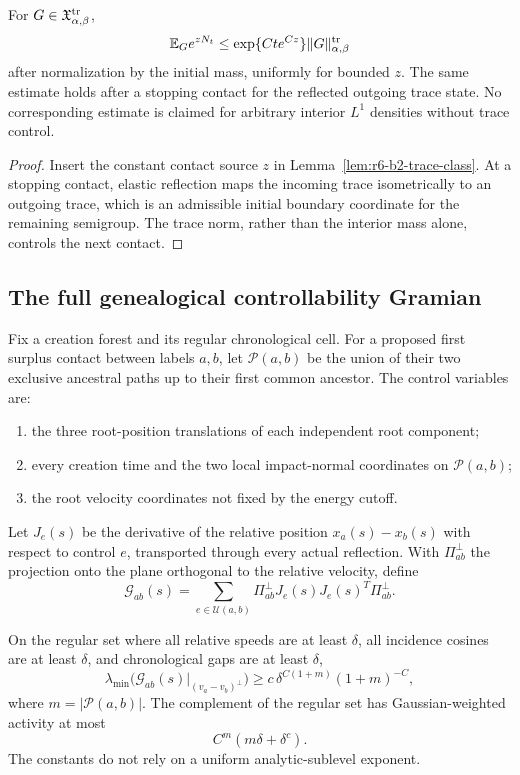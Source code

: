 \begin{corollary}
\label{cor:r6-b2-ledger}
For \(G\in\mathfrak X_{\alpha,\beta}^{\rm tr}\),
\[
\mathbb E_G e^{zN_t}
\le
\exp\{Cte^{Cz}\}
\|G\|_{\alpha,\beta}^{\rm tr}
\]
after normalization by the initial mass, uniformly for bounded \(z\).  The
same estimate holds after a stopping contact for the reflected outgoing trace
state.  No corresponding estimate is claimed for arbitrary interior
\(L^1\) densities without trace control.
\end{corollary}

\begin{proof}
Insert the constant contact source \(z\) in
Lemma~\ref{lem:r6-b2-trace-class}.  At a stopping contact, elastic reflection
maps the incoming trace isometrically to an outgoing trace, which is an
admissible initial boundary coordinate for the remaining semigroup.  The
trace norm, rather than the interior mass alone, controls the next contact.
\end{proof}

\subsection{The full genealogical controllability Gramian}

Fix a creation forest and its regular chronological cell.  For a proposed
first surplus contact between labels \(a,b\), let \(\mathcal P(a,b)\) be the
union of their two exclusive ancestral paths up to their first common
ancestor.  The control variables are:
\begin{enumerate}[label=(\roman*)]
\item the three root-position translations of each independent root
component;
\item every creation time and the two local impact-normal coordinates on
\(\mathcal P(a,b)\);
\item the root velocity coordinates not fixed by the energy cutoff.
\end{enumerate}
Let \(J_e(s)\) be the derivative of the relative position
\(x_a(s)-x_b(s)\) with respect to control \(e\), transported through every
actual reflection.  With \(\Pi_{ab}^\perp\) the projection onto the plane
orthogonal to the relative velocity, define
\[
\mathcal G_{ab}(s)=
\sum_{e\in\mathcal U(a,b)}
\Pi_{ab}^\perp J_e(s)J_e(s)^T\Pi_{ab}^\perp.
\]

\begin{lemma}
\label{lem:r6-b2-gramian}
On the regular set where all relative speeds are at least \(\delta\), all
incidence cosines are at least \(\delta\), and chronological gaps are at least
\(\delta\),
\[
\lambda_{\min}\bigl(\mathcal G_{ab}(s)|_{(v_a-v_b)^\perp}\bigr)
\ge c\,\delta^{C(1+m)}(1+m)^{-C},
\]
where \(m=|\mathcal P(a,b)|\).  The complement of the regular set has
Gaussian-weighted activity at most
\[
C^m\left(m\delta+\delta^c\right).
\]
The constants do not rely on a uniform analytic-sublevel exponent.
\end{lemma}

